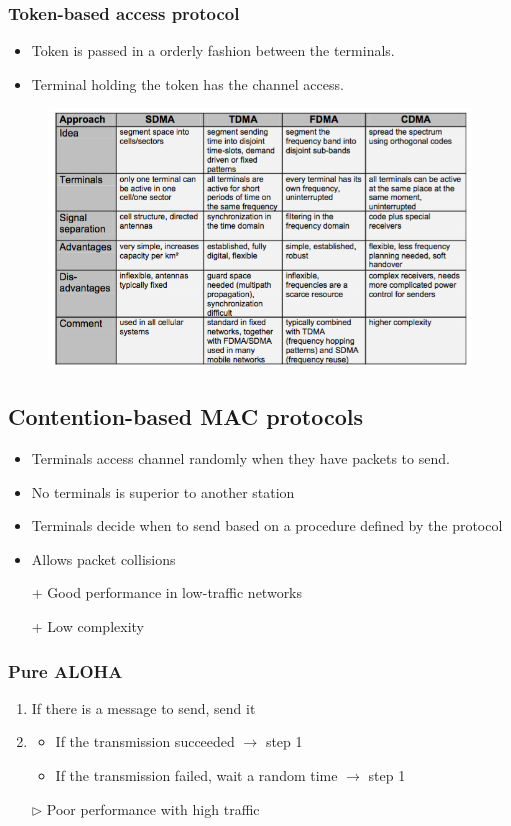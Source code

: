 \subsubsection{Token-based access protocol}
\begin{itemize}
	\item Token is passed in a orderly fashion between the terminals.
	\item Terminal holding the token has the channel access.
\end{itemize}
\begin{notImportant}
	\begin{figure}
	    \centering
	    \includegraphics[width=.99\linewidth]{img/contentionfree}
	 \end{figure}
\end{notImportant}
\subsection{Contention-based MAC protocols}
\begin{itemize}
	\item Terminals access channel randomly when they have packets to send.
	\item No terminals is superior to another station
	\item Terminals decide when to send based on a procedure defined by the protocol
	\item Allows packet collisions
	\item[+] Good performance in low-traffic networks
	\item[+] Low complexity
\end{itemize}
\subsubsection{Pure ALOHA}
\begin{enumerate}
	\item If there is a message to send, send it
	\item 
	\begin{itemize}
		\item If the transmission succeeded $\rightarrow$ step 1
   		\item If the transmission failed, wait a random time $\rightarrow$ step 1
	\end{itemize}
	\item[$\triangleright$] Poor performance with high traffic
\end{enumerate}
